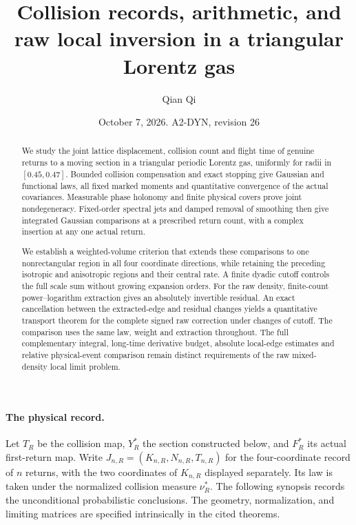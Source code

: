 \documentclass[11pt,reqno]{amsart}
\title[Collision records and raw local inversion]{Collision records, arithmetic, and raw local inversion in a triangular Lorentz gas}
\author{Qian Qi}
\date{October 7, 2026. A2-DYN, revision 26}
\numberwithin{equation}{section}
\theoremstyle{definition}\newtheorem{definition}[theorem]{Definition}
\theoremstyle{remark}\newtheorem{remark}[theorem]{Remark}
\begin{document}
\raggedbottom
\begin{abstract}
We study the joint lattice displacement, collision count and flight time
of genuine returns to a moving section in a triangular periodic Lorentz
gas, uniformly for radii in $[0.45,0.47]$. Bounded collision compensation
and exact stopping give Gaussian and functional laws, all fixed marked
moments and quantitative convergence of the actual covariances.
Measurable phase holonomy and finite physical covers prove joint
nondegeneracy. Fixed-order spectral jets and damped removal of smoothing
then give integrated Gaussian comparisons at a prescribed return count,
with a complex insertion at any one actual return.

We establish a weighted-volume criterion that extends these comparisons
to one nonrectangular region in all four coordinate directions, while
retaining the preceding isotropic and anisotropic regions and their
central rate. A finite dyadic cutoff controls the full scale sum without
growing expansion orders. For the raw density, finite-count
power--logarithm extraction gives an absolutely invertible residual.
An exact cancellation between the extracted-edge and residual changes
yields a quantitative transport theorem for the complete signed raw
correction under changes of cutoff. The comparison uses the same law,
weight and extraction throughout. The full complementary integral,
long-time derivative budget, absolute local-edge estimates and relative
physical-event comparison remain distinct requirements of the raw
mixed-density local limit problem.
\end{abstract}
\maketitle

\paragraph{The physical record.}
Let $T_R$ be the collision map, $Y_R^*$ the section constructed below,
and $F_R^*$ its actual first-return map. Write
$J_{n,R}=(K_{n,R},N_{n,R},T_{n,R})$ for the four-coordinate record of
$n$ returns, with the two coordinates of $K_{n,R}$ displayed separately.
Its law is taken under the normalized collision measure $\nu_R^*$.
The following synopsis records the unconditional probabilistic
conclusions. The geometry, normalization, and limiting matrices are
specified intrinsically in the cited theorems.
\end{document}
